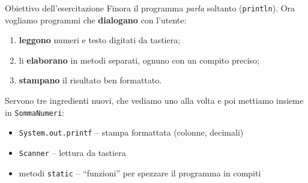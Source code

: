 \documentclass[10pt,aspectratio=169]{beamer}
\begin{document}
\begin{frame}[fragile]{Obiettivo dell'esercitazione}
Finora il programma \emph{parla} soltanto (\texttt{println}). Ora vogliamo programmi che \textbf{dialogano} con l'utente:
\begin{enumerate}\itemsep=0pt
    \item \textbf{leggono} numeri e testo digitati da tastiera;
    \item li \textbf{elaborano} in metodi separati, ognuno con un compito preciso;
    \item \textbf{stampano} il risultato ben formattato.
\end{enumerate}


\vspace{0.1cm}
Servono tre ingredienti nuovi, che vediamo uno alla volta e poi mettiamo insieme in \texttt{SommaNumeri}:
\begin{itemize}\itemsep=0pt
    \item \texttt{System.out.printf} -- stampa formattata (colonne, decimali)
    \item \texttt{Scanner} -- lettura da tastiera
    \item metodi \texttt{static} -- ``funzioni'' per spezzare il programma in compiti
\end{itemize}
\end{frame}
\end{document}
